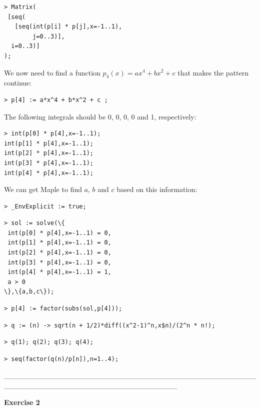 \documentclass{article}
\begin{document}
\begin{lstlisting}
> Matrix(
 [seq(
   [seq(int(p[i] * p[j],x=-1..1),
        j=0..3)],
  i=0..3)]
);
\end{lstlisting}
\begin{Maple Normal}
We now need to find a function 
$p_{4}(x)=a x^{4}+b x^{2}+c$ that makes the pattern continue: 
\end{Maple Normal}
\begin{lstlisting}
> p[4] := a*x^4 + b*x^2 + c ;
\end{lstlisting}
\begin{Maple Normal}
The following integrals should be 0, 0, 0, 0 and 1, respectively:
\end{Maple Normal}
\begin{lstlisting}
> int(p[0] * p[4],x=-1..1);
int(p[1] * p[4],x=-1..1);
int(p[2] * p[4],x=-1..1);
int(p[3] * p[4],x=-1..1);
int(p[4] * p[4],x=-1..1);
\end{lstlisting}
\begin{Maple Normal}
We can get Maple to find 
$a$, 
$b$ and 
$c$ based on this information:
\end{Maple Normal}
\begin{lstlisting}
> _EnvExplicit := true;
\end{lstlisting}
\begin{lstlisting}
> sol := solve(\{
 int(p[0] * p[4],x=-1..1) = 0,
 int(p[1] * p[4],x=-1..1) = 0,
 int(p[2] * p[4],x=-1..1) = 0,
 int(p[3] * p[4],x=-1..1) = 0,
 int(p[4] * p[4],x=-1..1) = 1,
 a > 0
\},\{a,b,c\});
\end{lstlisting}
\begin{lstlisting}
> p[4] := factor(subs(sol,p[4]));
\end{lstlisting}
\begin{lstlisting}
> q := (n) -> sqrt(n + 1/2)*diff((x^2-1)^n,x$n)/(2^n * n!);
\end{lstlisting}
\begin{lstlisting}
> q(1); q(2); q(3); q(4);
\end{lstlisting}
\begin{lstlisting}
> seq(factor(q(n)/p[n]),n=1..4);
\end{lstlisting}
\begin{Maple Normal}
\_\_\_\_\_\_\_\_\_\_\_\_\_\_\_\_\_\_\_\_\_\_\_\_\_\_\_\_\_\_\_\_\_\_\_\_\_\_\_\_\_\_\_\_\_\_\_\_\_\_\_\_\_\_\_\_\_\_\_\_\_\_\_\_\_\_\_\_\_\_\_\_\_\_\_\_\_\_\_\_\_
\end{Maple Normal}
\begin{Maple Normal}
\textbf{Exercise 2}
\end{Maple Normal}
\end{document}

